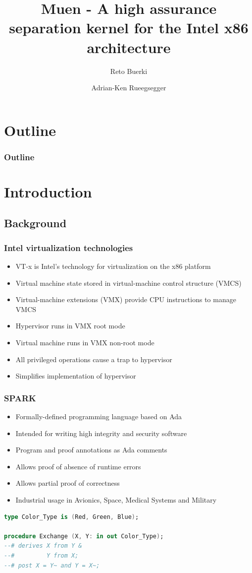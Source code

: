 \documentclass[xcolor={dvipsnames}]{beamer}
\title[Muen Separation Kernel]{Muen - A high assurance separation kernel for the Intel x86 architecture}
\author{Reto Buerki \and Adrian-Ken Rueegsegger}
\institute[HSR]
{
	Institute for Internet Technologies and Applications\\
	University of Applied Sciences Rapperswil
}
\begin{document}
\begin{frame}
	\titlepage
\end{frame}

\section*{Outline}
\begin{frame}
	\frametitle{Outline}\tableofcontents
\end{frame}

\section{Introduction}
\subsection{Background}
\begin{frame}\frametitle{Intel virtualization technologies}
\begin{itemize}
	\item VT-x is Intel's technology for virtualization on the x86 platform
	\item Virtual machine state stored in virtual-machine control structure (VMCS)
	\item Virtual-machine extensions (VMX) provide CPU instructions to manage VMCS
	\item Hypervisor runs in VMX root mode
	\item Virtual machine runs in VMX non-root mode
	\item All privileged operations cause a trap to hypervisor
	\item Simplifies implementation of hypervisor
\end{itemize}
\end{frame}

\begin{frame}[fragile]\frametitle{SPARK}
\begin{itemize}
	\item Formally-defined programming language based on Ada
	\item Intended for writing high integrity and security software
	\item Program and proof annotations as Ada comments
	\item Allows proof of absence of runtime errors
	\item Allows partial proof of correctness
	\item Industrial usage in Avionics, Space, Medical Systems and Military
\end{itemize}
\begin{lstlisting}[language=Ada]
type Color_Type is (Red, Green, Blue);

procedure Exchange (X, Y: in out Color_Type);
--# derives X from Y &
--#         Y from X;
--# post X = Y~ and Y = X~;
\end{lstlisting}
\end{frame}
\end{document}
